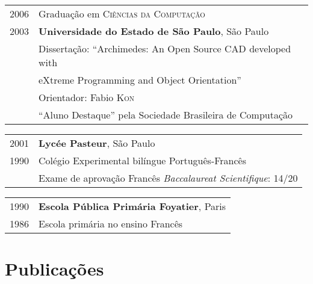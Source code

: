\documentclass[letter,10pt]{article}
\begin{document}
\begin{tabular}{p{2.5cm}l}
  \textsc{2006} & Graduação em \textsc{Ciências da Computação}\\
  \textsc{2003} &\normalsize\textbf{Universidade do Estado de São Paulo}, São Paulo\\
  & Dissertação: ``Archimedes: An Open Source CAD developed with\\
  & eXtreme Programming and Object Orientation''\\
  & \small Orientador: Fabio \textsc{Kon}\\
  & ``Aluno Destaque'' pela Sociedade Brasileira de Computação\\
\end{tabular}

\begin{tabular}{p{2.5cm}l}
  \textsc{2001} & \textbf{Lycée Pasteur}, São Paulo\\
  \textsc{1990} & Colégio Experimental bilíngue Português-Francês\\
  & Exame de aprovação Francês \textit{Baccalaureat Scientifique}: 14/20
\end{tabular}

\begin{tabular}{p{2.5cm}l}
  \textsc{1990} & \textbf{Escola Pública Primária Foyatier}, Paris\\
  \textsc{1986} & Escola primária no ensino Francês\\
\end{tabular}

\section{Publicações}
\end{document}

